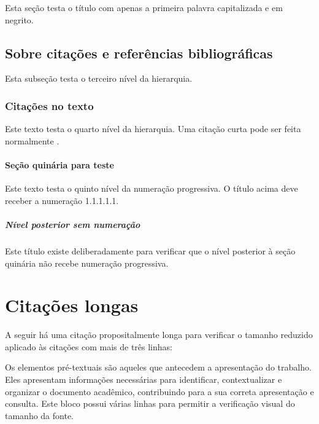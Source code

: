 Esta seção testa o título com apenas a primeira palavra capitalizada
e em negrito.

\subsection{Sobre citações e referências bibliográficas}

Esta subseção testa o terceiro nível da hierarquia.

\subsubsection{Citações no texto}

Este texto testa o quarto nível da hierarquia.
Uma citação curta pode ser feita normalmente \cite{senac2014guia}.

\paragraph{Seção quinária para teste}

Este texto testa o quinto nível da numeração progressiva.
O título acima deve receber a numeração 1.1.1.1.1.

\subparagraph{Nível posterior sem numeração}

Este título existe deliberadamente para verificar que o nível posterior
à seção quinária não recebe numeração progressiva.


\section{Citações longas}

A seguir há uma citação propositalmente longa para verificar o
tamanho reduzido aplicado às citações com mais de três linhas:

\begin{citacao}
Os elementos pré-textuais são aqueles que antecedem a apresentação do
trabalho. Eles apresentam informações necessárias para identificar,
contextualizar e organizar o documento acadêmico, contribuindo para a
sua correta apresentação e consulta. Este bloco possui várias linhas
para permitir a verificação visual do tamanho da fonte.
\end{citacao}


